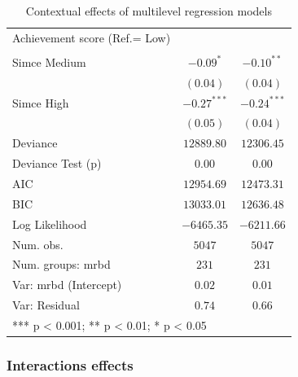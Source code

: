 \documentclass[
  letterpaper,
  DIV=11,
  numbers=noendperiod]{scrartcl}
\begin{document}
\begin{table}
\begin{center}
\begin{tabular}{l c c}
Achievement score (Ref.= Low)            &               &               \\
                                         &               &               \\
\quad Simce Medium                       & $-0.09^{*}$   & $-0.10^{**}$  \\
                                         & $(0.04)$      & $(0.04)$      \\
\quad Simce High                         & $-0.27^{***}$ & $-0.24^{***}$ \\
                                         & $(0.05)$      & $(0.04)$      \\
\hline
Deviance                                 & $12889.80$    & $12306.45$    \\
Deviance Test (p)                        & $0.00$        & $0.00$        \\
AIC                                      & $12954.69$    & $12473.31$    \\
BIC                                      & $13033.01$    & $12636.48$    \\
Log Likelihood                           & $-6465.35$    & $-6211.66$    \\
Num. obs.                                & $5047$        & $5047$        \\
Num. groups: mrbd                        & $231$         & $231$         \\
Var: mrbd (Intercept)                    & $0.02$        & $0.01$        \\
Var: Residual                            & $0.74$        & $0.66$        \\
\hline
\multicolumn{3}{l}{\scriptsize{*** p < 0.001; ** p < 0.01; * p < 0.05}}
\end{tabular}
\caption{\label{tbl-contextual-reg}Contextual effects of multilevel regression models }
\label{table:coefficients}
\end{center}
\end{table}

\hypertarget{interactions-effects}{%
\subsubsection{Interactions effects}\label{interactions-effects}}
\end{document}
